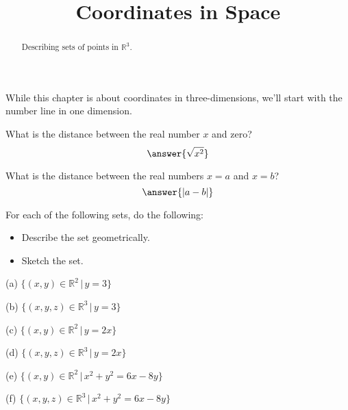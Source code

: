 \documentclass{ximera}
\title{Coordinates in Space}
\begin{document}
\begin{abstract}
Describing sets of points in $\mathbb{R}^3$.
\end{abstract}
\maketitle

While this chapter is about coordinates in three-dimensions, we'll start with the number line in one dimension.

\begin{question}  \label{Q0:Coordinates}
What is the distance between the real number $x$ and zero?
\[
   \answer{\sqrt{x^2}}
\]
\end{question}

\begin{question}  \label{Q00:Coordinates}
What is the distance between the real numbers $x=a$ and $x=b$?
\[
   \answer{\lvert a-b \rvert}
\]
\end{question}


\begin{question} \label{Q1:Coordinates}
For each of the following sets, do the following:

\begin{itemize}
\item{Describe the set geometrically.}

\item{Sketch the set.}

\end{itemize}

(a) $\{  (x,y)\in \mathbb{R}^2 \, | \, y=3  \}$

(b) $\{  (x,y,z)\in \mathbb{R}^3 \, | \, y=3  \}$

(c) $\{  (x,y)\in \mathbb{R}^2 \, | \, y=2x  \}$

(d) $\{  (x,y,z)\in \mathbb{R}^3 \, | \, y=2x  \}$

(e) $\{  (x,y)\in \mathbb{R}^2 \, | \,  x^2 + y^2 = 6x - 8y  \}$

(f)  $\{  (x,y,z)\in \mathbb{R}^3 \, | \, x^2 + y^2 = 6x - 8y  \}$

\end{question}
\end{document}
